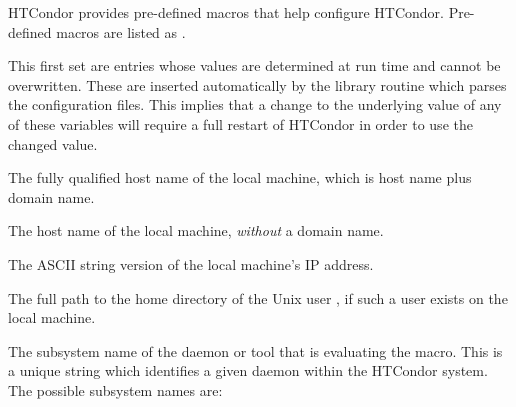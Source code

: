 HTCondor provides pre-defined macros that help configure HTCondor.
Pre-defined macros are listed as .

This first set are entries whose values are determined at
run time and cannot be overwritten.  These are inserted automatically by
the library routine which parses the configuration files.
This implies that a change to the underlying value of any of these
variables will require a full restart of HTCondor in order to use
the changed value.
\begin{description}
  
\label{param:FullHostname}
\item[\MacroU{FULL\_HOSTNAME}]
  The fully qualified host name of the local machine, 
  which is host name plus domain name.
  
\label{param:Hostname}
\item[\MacroU{HOSTNAME}]
  The host name of the local machine, \emph{without} a domain name.
  
\label{param:IpAddress}
\item[\MacroU{IP\_ADDRESS}]
  The ASCII string version of the local machine's IP address.

\label{param:Tilde}
\item[\MacroU{TILDE}]
  The full path to the
  home directory of the Unix user , if such a user exists on the
  local machine.

  \label{sec:HTCondor-Subsystem-Names}
\label{param:Subsystem}
\item[\MacroU{SUBSYSTEM}]
  The subsystem
  name of the daemon or tool that is evaluating the macro.
  This is a unique string which identifies a given daemon within the
  HTCondor system.  The possible subsystem names are:


\end{description}
